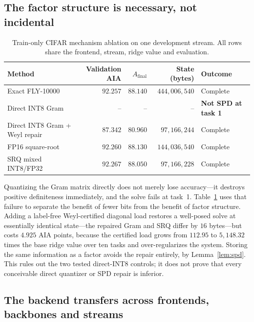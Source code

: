 \documentclass{article}
\begin{document}
\subsection{The factor structure is necessary, not incidental}
\label{sec:mechanism}

\begin{table}[t]
\caption{Train-only CIFAR mechanism ablation on one development stream. All
rows share the frontend, stream, ridge value and evaluation.}
\label{tab:mechanism}
\centering
\small
\begin{tabular}{lrrrl}
\toprule
Method & Validation AIA & $A_{\mathrm{final}}$ & State (bytes) & Outcome\\
\midrule
Exact FLY-10000                & $92.257$ & $88.140$ & $444{,}006{,}540$ & Complete\\
Direct INT8 Gram               & --       & --       & --                & \textbf{Not SPD at task 1}\\
Direct INT8 Gram + Weyl repair & $87.342$ & $80.960$ & $97{,}166{,}244$  & Complete\\
FP16 square-root               & $92.260$ & $88.130$ & $144{,}036{,}540$ & Complete\\
SRQ mixed INT8/FP32            & $92.267$ & $88.050$ & $97{,}166{,}228$  & Complete\\
\bottomrule
\end{tabular}
\end{table}

Quantizing the Gram matrix directly does not merely lose accuracy---it
destroys positive definiteness immediately, and the solve fails at task~1.
Table~\ref{tab:mechanism} uses that failure to separate the benefit of fewer
bits from the benefit of factor structure. Adding a label-free
Weyl-certified diagonal load restores a well-posed solve at essentially
identical state---the repaired Gram and SRQ differ by $16$ bytes---but costs
$4.925$ AIA points, because the certified load grows from $112.95$ to
$5{,}148.32$ times the base ridge value over ten tasks and over-regularizes the
system. Storing the same information as a factor avoids the repair entirely, by
Lemma~\ref{lem:spd}. This rules out the two tested direct-INT8 controls; it
does not prove that every conceivable direct quantizer or SPD repair is
inferior.

\subsection{The backend transfers across frontends, backbones and streams}
\label{sec:portability}
\end{document}
